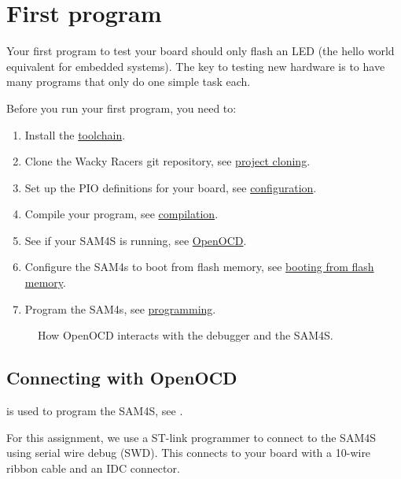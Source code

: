 \chapter{First program}
\label{first-program}

Your first program to test your board should only flash an LED (the
hello world equivalent for embedded systems). The key to testing new
hardware is to have many programs that only do one simple task each.

Before you run your first program, you need to:
%
\begin{enumerate}
\item Install the \hyperref[toolchain]{toolchain}.

\item Clone the Wacky Racers git repository, see
  \hyperref[project-cloning]{project cloning}.

\item Set up the PIO definitions for your board, see
  \hyperref[configuration]{configuration}.

\item Compile your program, see \hyperref[compilation]{compilation}.

\item See if your SAM4S is running, see \hyperref[openocd]{OpenOCD}.

\item Configure the SAM4s to boot from flash memory, see
  \hyperref[booting-from-flash-memory]{booting from flash memory}.

\item Program the SAM4s, see \hyperref[programming]{programming}.
\end{enumerate}


\begin{figure}

\caption{How OpenOCD interacts with the debugger and the SAM4S.}
\label{fig:openocd diagram}
\end{figure}


\section{Connecting with OpenOCD}
\label{openocd}

 is used to program the SAM4S, see .

For this assignment, we use a ST-link programmer to connect to the
SAM4S using serial wire debug (SWD). This connects to your board with
a 10-wire ribbon cable and an IDC connector.

